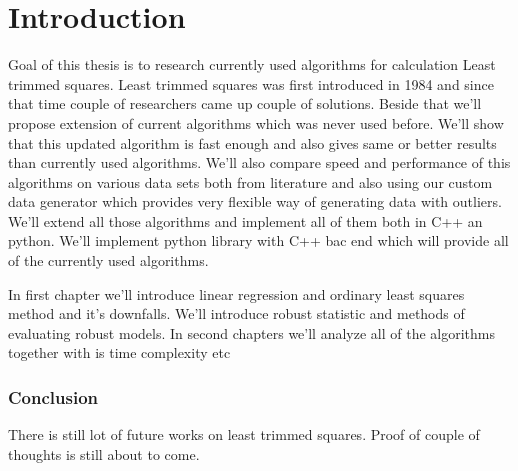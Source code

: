 \chapter{Introduction}
Goal of this thesis is to research currently used algorithms for calculation Least trimmed squares. Least trimmed squares was first introduced in 1984 and since that time couple of researchers came up couple of solutions. Beside that we'll propose extension of current algorithms which was never used before. We'll show that this updated algorithm is fast enough and also gives same or better results than currently used algorithms. We'll also compare speed  and performance of this algorithms on various data sets both from literature and also using our custom data generator which provides very flexible way of generating data with outliers. 
We'll extend all those algorithms and implement all of them both in C++ an python. 
We'll implement python library with C++ bac end which will provide all of the currently used algorithms.

In first chapter we'll introduce linear regression and ordinary least squares method and it's downfalls. We'll introduce robust statistic and methods of evaluating robust models.
In second chapters we'll analyze all of the algorithms together with is time complexity etc


\subsection{Conclusion}
There is still lot of future works on least trimmed squares. Proof of couple of thoughts is still about to come. 

